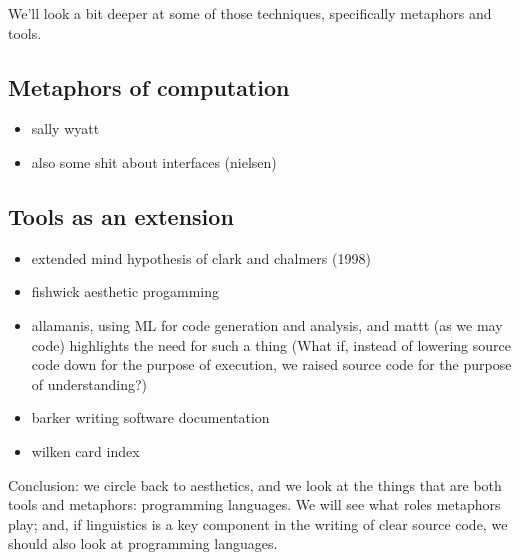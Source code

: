 We'll look a bit deeper at some of those techniques, specifically metaphors and tools.

\subsection{Metaphors of computation}

\begin{itemize}
    \item sally wyatt
    \item also some shit about interfaces (nielsen)
\end{itemize}

\subsection{Tools as an extension}

\begin{itemize}
    \item extended mind hypothesis of clark and chalmers (1998)
    \item fishwick aesthetic progamming
    \item allamanis, using ML for code generation and analysis, and mattt (as we may code) highlights the need for such a thing (What if, instead of lowering source code down for the purpose of execution, we raised source code for the purpose of understanding?)
    \item barker writing software documentation
    \item wilken card index
\end{itemize}


\pagebreak

Conclusion: we circle back to aesthetics, and we look at the things that are both tools and metaphors: programming languages. We will see what roles metaphors play; and, if linguistics is a key component in the writing of clear source code, we should also look at programming languages.